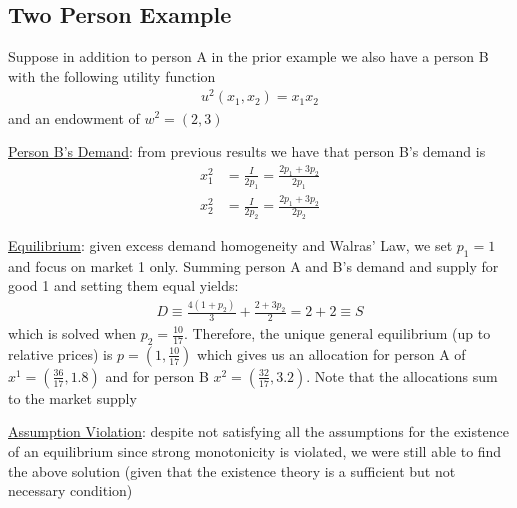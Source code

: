 \documentclass{article}
\begin{document}
\subsection{Two Person Example}
Suppose in addition to person A in the prior example we also have a person B with the following utility function
\begin{gather*}
  u^{2}(x_{1},x_{2}) = x_{1}x_{2}
\end{gather*}
and an endowment of $w^{2} = (2,3)$
\par \vspace{0.3em}
  \underline{Person B's Demand}: from previous results we have that person B's demand is
  \begin{align*}
    x_{1}^{2} &= \frac{I}{2p_{1}} = \frac{2p_{1} + 3p_{2}}{2p_{1}} \\
    x_{2}^{2} &= \frac{I}{2p_{2}} = \frac{2p_{1} + 3p_{2}}{2p_{2}}
  \end{align*}
  \par
  \underline{Equilibrium}: given excess demand homogeneity and Walras' Law, we set $p_{1} = 1$ and focus on market 1 only. Summing person A and B's demand and supply for good 1 and setting them equal yields:
  \begin{gather*}
    D \equiv \frac{4(1+p_{2})}{3} + \frac{2+3p_{2}}{2} = 2 + 2 \equiv S
  \end{gather*}
  which is solved when $p_{2} = \tfrac{10}{17}$. Therefore, the unique general equilibrium (up to relative prices) is $p = (1, \tfrac{10}{17})$ which gives us an allocation for person A of $x^{1} = (\tfrac{36}{17},1.8)$ and for person B $x^{2} = (\tfrac{32}{17}, 3.2)$. Note that the allocations sum to the market supply
  \par
  \underline{Assumption Violation}: despite not satisfying all the assumptions for the existence of an equilibrium since strong monotonicity is violated, we were still able to find the above solution (given that the existence theory is a sufficient but not necessary condition)
  \par
\vspace{6mm}
\end{document}
